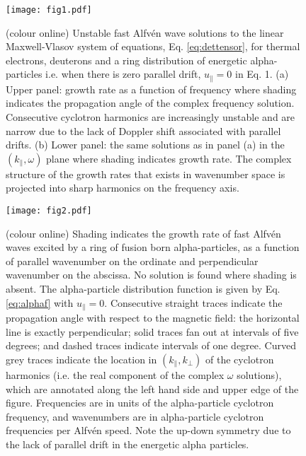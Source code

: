 \documentclass[12pt]{iopart}
\begin{document}
\begin{figure}[ht!]
    \raggedleft
\texttt{[image: fig1.pdf]}
    \caption{(colour online) Unstable fast Alfv{\'e}n wave solutions to the linear Maxwell-Vlasov system of equations, Eq. \ref{eq:dettensor}, for thermal electrons, deuterons and a ring distribution of energetic alpha-particles i.e. when there is zero parallel drift, $u_\parallel=0$ in Eq. 1. (a) Upper panel: growth rate as a function of frequency where shading indicates the propagation angle of the complex frequency solution. Consecutive cyclotron harmonics are increasingly unstable and are narrow due to the lack of Doppler shift associated with parallel drifts. (b) Lower panel: the same solutions as in panel (a) in the $(k_\parallel,\omega)$ plane where shading indicates growth rate. The complex structure of the growth rates that exists in wavenumber space is projected into sharp harmonics on the frequency axis.}
    \label{fig:2D_F12_zeropitch}
\end{figure}


\begin{figure}[ht!]
    \raggedleft
\texttt{[image: fig2.pdf]}
    \caption{(colour online) Shading indicates the growth rate of fast Alfv{\'e}n waves excited by a ring of fusion born alpha-particles, as a function of parallel wavenumber on the ordinate and perpendicular wavenumber on the abscissa. No solution is found where shading is absent. The alpha-particle distribution function is given by Eq. \ref{eq:alphaf} with $u_{\parallel} = 0$. Consecutive straight traces indicate the propagation angle with respect to the magnetic field: the horizontal line is exactly perpendicular; solid traces fan out at intervals of five degrees; and dashed traces indicate intervals of one degree. Curved grey traces indicate the location in $(k_\parallel, k_\perp)$ of the cyclotron harmonics (i.e. the real component of the complex $\omega$ solutions), which are annotated along the left hand side and upper edge of the figure. Frequencies are in units of the alpha-particle cyclotron frequency, and wavenumbers are in alpha-particle cyclotron frequencies per Alfv{\'e}n speed. Note the up-down symmetry due to the lack of parallel drift in the energetic alpha particles.}
    \label{fig:2D_imag_zeropitch}
\end{figure}
\end{document}
